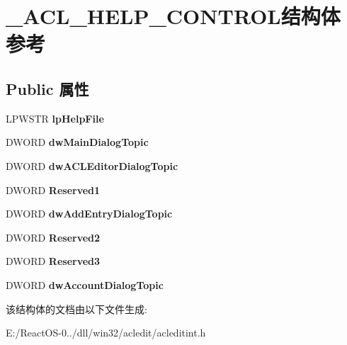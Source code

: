 \hypertarget{struct___a_c_l___h_e_l_p___c_o_n_t_r_o_l}{}\section{\+\_\+\+A\+C\+L\+\_\+\+H\+E\+L\+P\+\_\+\+C\+O\+N\+T\+R\+O\+L结构体 参考}
\label{struct___a_c_l___h_e_l_p___c_o_n_t_r_o_l}
\subsection*{Public 属性}
\begin{DoxyCompactItemize}
\item 
\mbox{\label{struct___a_c_l___h_e_l_p___c_o_n_t_r_o_l_ad0369bf070312dde967f06f2ef396d7e}} 
L\+P\+W\+S\+TR {\bfseries lp\+Help\+File}
\item 
\mbox{\label{struct___a_c_l___h_e_l_p___c_o_n_t_r_o_l_a9e407ac348b056aaa1ffcc43bff6e1bc}} 
D\+W\+O\+RD {\bfseries dw\+Main\+Dialog\+Topic}
\item 
\mbox{\label{struct___a_c_l___h_e_l_p___c_o_n_t_r_o_l_a11aacf64819ca828cfb6381027cda993}} 
D\+W\+O\+RD {\bfseries dw\+A\+C\+L\+Editor\+Dialog\+Topic}
\item 
\mbox{\label{struct___a_c_l___h_e_l_p___c_o_n_t_r_o_l_a9cf550142bd4c89ab358cb6809785577}} 
D\+W\+O\+RD {\bfseries Reserved1}
\item 
\mbox{\label{struct___a_c_l___h_e_l_p___c_o_n_t_r_o_l_a88cbce5c50163eed20d03cf2b9b0f1a6}} 
D\+W\+O\+RD {\bfseries dw\+Add\+Entry\+Dialog\+Topic}
\item 
\mbox{\label{struct___a_c_l___h_e_l_p___c_o_n_t_r_o_l_a02f3ed3b180be58573785c7597ea6a7e}} 
D\+W\+O\+RD {\bfseries Reserved2}
\item 
\mbox{\label{struct___a_c_l___h_e_l_p___c_o_n_t_r_o_l_a0a0f9b4f3a07daf84fe03eac64a622ed}} 
D\+W\+O\+RD {\bfseries Reserved3}
\item 
\mbox{\label{struct___a_c_l___h_e_l_p___c_o_n_t_r_o_l_a7860f7c4c69c31bc1833657cdeccdd3a}} 
D\+W\+O\+RD {\bfseries dw\+Account\+Dialog\+Topic}
\end{DoxyCompactItemize}


该结构体的文档由以下文件生成\+:\begin{DoxyCompactItemize}
\item 
E\+:/\+React\+O\+S-\/0../dll/win32/acledit/acleditint.\+h\end{DoxyCompactItemize}
